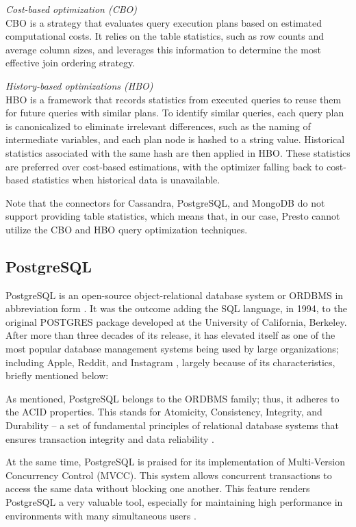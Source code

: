 \documentclass[conference]{IEEEtran}
\begin{document}
\textit{Cost-based optimization (CBO)} \\
CBO is a strategy that evaluates query execution plans based on estimated computational costs. It relies on the table statistics, such as row counts and average column sizes, and leverages this information to determine the most effective join ordering strategy.\cite{b7}

\textit{History-based optimizations (HBO)} \\
HBO is a framework that records statistics from executed queries to reuse them for future queries with similar plans. To identify similar queries, each query plan is canonicalized to eliminate irrelevant differences, such as the naming of intermediate variables, and each plan node is hashed to a string value. Historical statistics associated with the same hash are then applied in HBO. These statistics are preferred over cost-based estimations, with the optimizer falling back to cost-based statistics when historical data is unavailable.\cite{b3}

Note that the connectors for Cassandra, PostgreSQL, and MongoDB do not support providing table statistics, which means that, in our case, Presto cannot utilize the CBO and HBO query optimization techniques.

\subsection{PostgreSQL}

PostgreSQL is an open-source object-relational database system or ORDBMS in abbreviation form \cite{b8}. It was the outcome adding the SQL language, in 1994, to the original POSTGRES package developed at the University of California, Berkeley. After more than three decades of its release, it has elevated itself as one of the most popular database management systems being used by large organizations; including Apple, Reddit, and Instagram \cite{b9}, largely because of its characteristics, briefly mentioned below:

As mentioned, PostgreSQL belongs to the ORDBMS family; thus, it adheres to the ACID properties. This stands for Atomicity, Consistency, Integrity, and Durability – a set of fundamental principles of relational database systems that ensures transaction integrity and data reliability \cite{b10, b11}.

At the same time, PostgreSQL is praised for its implementation of Multi-Version Concurrency Control (MVCC). This system allows concurrent transactions to access the same data without blocking one another. This feature renders PostgreSQL a very valuable tool, especially for maintaining high performance in environments with many simultaneous users \cite{b9}.
\end{document}
